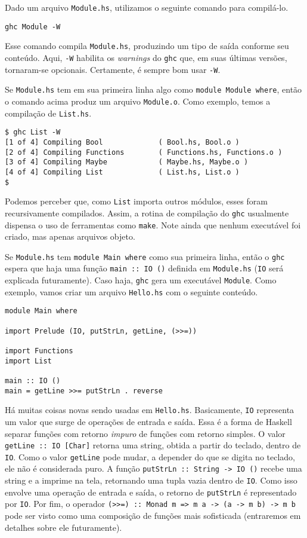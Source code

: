 \documentclass[a4paper]{article}
\begin{document}
Dado um arquivo \texttt{Module.hs}, utilizamos o seguinte comando para compilá-lo.

\begin{verbatim}
ghc Module -W
\end{verbatim}

Esse comando compila \texttt{Module.hs}, produzindo um tipo de saída conforme seu conteúdo.
Aqui, \texttt{-W} habilita os \emph{warnings} do \texttt{ghc} que, em suas últimas versões, tornaram-se opcionais.
Certamente, é sempre bom usar \texttt{-W}.

Se \texttt{Module.hs} tem em sua primeira linha algo como \texttt{module Module where}, então o comando acima produz um arquivo \texttt{Module.o}.
Como exemplo, temos a compilação de \texttt{List.hs}.

\begin{verbatim}
$ ghc List -W
[1 of 4] Compiling Bool             ( Bool.hs, Bool.o )
[2 of 4] Compiling Functions        ( Functions.hs, Functions.o )
[3 of 4] Compiling Maybe            ( Maybe.hs, Maybe.o )
[4 of 4] Compiling List             ( List.hs, List.o )
$
\end{verbatim}

Podemos perceber que, como \texttt{List} importa outros módulos, esses foram recursivamente compilados.
Assim, a rotina de compilação do \texttt{ghc} usualmente dispensa o uso de ferramentas como \texttt{make}.
Note ainda que nenhum executável foi criado, mas apenas arquivos objeto.

Se \texttt{Module.hs} tem \texttt{module Main where} como sua primeira linha, então o \texttt{ghc} espera que haja uma função \texttt{main :: IO ()} definida em \texttt{Module.hs} (\texttt{IO} será explicada futuramente).
Caso haja, \texttt{ghc} gera um executável \texttt{Module}.
Como exemplo, vamos criar um arquivo \texttt{Hello.hs} com o seguinte conteúdo.

\begin{verbatim}
module Main where

import Prelude (IO, putStrLn, getLine, (>>=))

import Functions
import List

main :: IO ()
main = getLine >>= putStrLn . reverse
\end{verbatim}

Há muitas coisas novas sendo usadas em \texttt{Hello.hs}.
Basicamente, \texttt{IO} representa um valor que surge de operações de entrada e saída.
Essa é a forma de Haskell separar funções com retorno \emph{impuro} de funções com retorno simples.
O valor \mbox{\texttt{getLine :: IO [Char]}} retorna uma string, obtida a partir do teclado, dentro de \texttt{IO}.
Como o valor \texttt{getLine} pode mudar, a depender do que se digita no teclado, ele não é considerada puro.
A função \mbox{\texttt{putStrLn :: String -> IO ()}} recebe uma string e a imprime na tela, retornando uma tupla vazia dentro de \texttt{IO}.
Como isso envolve uma operação de entrada e saída, o retorno de \texttt{putStrLn} é representado por \texttt{IO}.
Por fim, o operador \mbox{\texttt{(>>=) :: Monad m => m a -> (a -> m b) -> m b}} pode ser visto como uma composição de funções mais sofisticada (entraremos em detalhes sobre ele futuramente).
\end{document}
